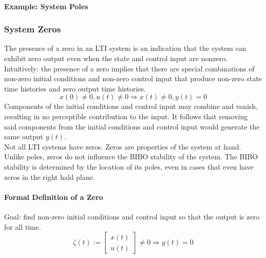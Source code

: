 \documentclass[../notes.tex]{subfiles}
\begin{document}
\paragraph{Example: System Poles}

\subsubsection{System Zeros}
The presence of a zero in an LTI system is an indication that the system can exhibit zero output even when the state and control input are nonzero. Intuitively: the presence of a zero implies that there are special combinations of non-zero initial conditions and non-zero control input that produce non-zero state time histories and zero output time histories.
\begin{equation*}
    x(0) \neq 0, u(t) \neq 0 \Rightarrow x(t) \neq 0, y(t) = 0
\end{equation*}
Components of the initial conditions and control input may combine and vanish, resulting in no perceptible contribution to the input. It follows that removing said components from the initial conditions and control input would generate the same output $y(t)$. \\
Not all LTI systems have zeros. Zeros are properties of the system at hand. Unlike poles, zeros do not influence the BIBO stability of the system. The BIBO stability is determined by the location of its poles, even in cases that even have zeros in the right hald plane.
\paragraph{Formal Definition of a Zero}
Goal: find non-zero initial conditions and control input so that the output is zero for all time.
\begin{equation*}
    \zeta (t) := \begin{bmatrix}
        x(t) \\ u(t)
    \end{bmatrix} \neq 0 \Rightarrow y(t) = 0
\end{equation*}
\end{document}
